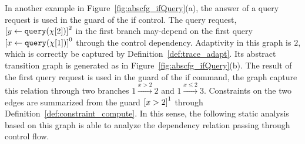 In another example in Figure~\ref{fig:abscfg_ifQuery}(a), the answer of a query request is used in the guard of the if control. The
query request, $\clabel{\assign{y}{\query(\chi[2])}}^2$  in the first branch may-depend on
the first query $\clabel{\assign{x}{\query(\chi[1])}}^0$ through the control dependency.
Adaptivity in this graph is $2$, which is correctly be captured by Definition~\ref{def:trace_adapt}.
Its abstract transition graph is generated as in Figure~\ref{fig:abscfg_ifQuery}(b).
The result of the first query request is used in the guard of the if command, the graph
capture this relation through two branches
$1 \xrightarrow{x>2} 2$ and $1 \xrightarrow{x \leq 2} 3$.
Constraints on the two edges are summarized from the guard $\clabel{x > 2}^1$ through Definition~\ref{def:constraint_compute}.
In this sense, the following static analysis based on this graph is able to analyze the dependency relation passing through control flow.
